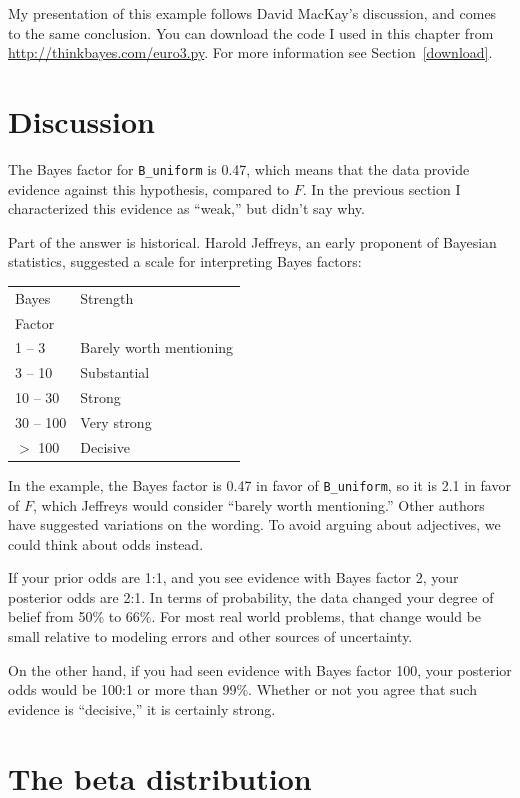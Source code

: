 \documentclass[12pt]{book}
\theoremstyle{exercise}
\begin{document}
My presentation of this example follows
David MacKay's discussion, and comes to the same conclusion.
You can download the code I used in this chapter from
\url{http://thinkbayes.com/euro3.py}.
  For more information
see Section~\ref{download}.

\section{Discussion}

The Bayes factor for \verb"B_uniform" is 0.47, which means
that the data provide evidence against this hypothesis, compared
to $F$.  In the previous section I characterized this evidence
as ``weak,'' but didn't say why.

Part of the answer is historical.  Harold Jeffreys, an early
proponent of Bayesian statistics, suggested a scale for
interpreting Bayes factors:

\begin{tabular}{|l|l|}
\hline
Bayes & Strength \\
Factor & \\
\hline
1 -- 3 & Barely worth mentioning \\
3 -- 10 & Substantial \\
10 -- 30 & Strong \\
30 -- 100 & Very strong \\
$>$ 100 & Decisive \\
\hline
\end{tabular}

In the example, the Bayes factor is 0.47 in favor of \verb"B_uniform",
so it is 2.1 in favor of $F$, which Jeffreys would consider ``barely
worth mentioning.''  Other authors have suggested variations on the
wording.  To avoid arguing about adjectives, we could think about odds
instead.

If your prior odds are 1:1, and you see evidence with Bayes
factor 2, your posterior odds are 2:1.  In terms of probability,
the data changed your degree of belief from 50\% to 66\%.  For
most real world problems, that change would be small relative
to modeling errors and other sources of uncertainty.

On the other hand, if you had seen evidence with Bayes
factor 100, your posterior odds would be 100:1 or more than 99\%.
Whether or not you agree that such evidence is ``decisive,''
it is certainly strong.

\section{The beta distribution}
\label{beta}
\end{document}
